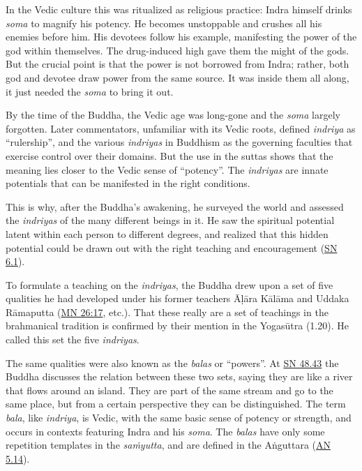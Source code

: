 \documentclass[12pt,openany]{book}%
\begin{document}
In the Vedic culture this was ritualized as religious practice: Indra himself drinks \textit{soma} to magnify his potency. He becomes unstoppable and crushes all his enemies before him. His devotees follow his example, manifesting the power of the god within themselves. The drug-induced high gave them the might of the gods. But the crucial point is that the power is not borrowed from Indra; rather, both god and devotee draw power from the same source. It was inside them all along, it just needed the \textit{soma} to bring it out.

By the time of the Buddha, the Vedic age was long-gone and the \textit{soma} largely forgotten. Later commentators, unfamiliar with its Vedic roots, defined \textit{indriya} as “rulership”, and the various \textit{indriyas} in Buddhism as the governing faculties that exercise control over their domains. But the use in the suttas shows that the meaning lies closer to the Vedic sense of “potency”. The \textit{indriyas} are innate potentials that can be manifested in the right conditions.

This is why, after the Buddha’s awakening, he surveyed the world and assessed the \textit{indriyas} of the many different beings in it. He saw the spiritual potential latent within each person to different degrees, and realized that this hidden potential could be drawn out with the right teaching and encouragement (\href{https://suttacentral.net/sn6.1}{SN 6.1}).

To formulate a teaching on the \textit{indriyas}, the Buddha drew upon a set of five qualities he had developed under his former teachers \textsanskrit{Āḷāra} \textsanskrit{Kālāma} and Uddaka \textsanskrit{Rāmaputta} (\href{https://suttacentral.net/mn26\#17}{MN 26:17}, etc.). That these really are a set of teachings in the brahmanical tradition is confirmed by their mention in the \textsanskrit{Yogasūtra} (1.20). He called this set the five \textit{indriyas}.

The same qualities were also known as the \textit{balas} or “powers”. At \href{https://suttacentral.net/sn48.43}{SN 48.43} the Buddha discusses the relation between these two sets, saying they are like a river that flows around an island. They are part of the same stream and go to the same place, but from a certain perspective they can be distinguished. The term \textit{bala}, like \textit{indriya}, is Vedic, with the same basic sense of potency or strength, and occurs in contexts featuring Indra and his \textit{soma}. The \textit{balas} have only some repetition templates in the \textit{\textsanskrit{saṁyutta}}, and are defined in the \textsanskrit{Aṅguttara} (\href{https://suttacentral.net/an5.14}{AN 5.14}).
\end{document}
